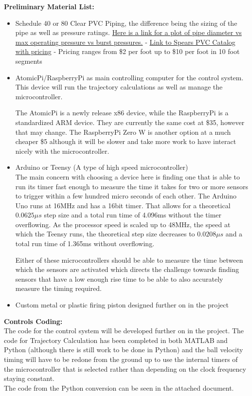 \documentclass[11pt,letterpaper]{scrartcl}
\begin{document}
	\textbf{	Preliminary Material List:}
	\begin{itemize}
	\item Schedule 40 or 80 Clear PVC Piping, the difference being the sizing of the pipe as well as pressure ratings. \href{https://www.engineeringtoolbox.com/pvc-cpvc-pipes-pressures-d_796.html}{Here is a link for a plot of pipe diameter vs max operating pressure vs burst pressures.}
	\subitem - \href{http://63.156.201.111/SMC/PIPE_PIPE.htm#CLR10}{Link to Spears PVC Catalog with pricing}
	\subitem - Pricing ranges from \$2 per foot up to \$10 per foot in 10 foot segments
	
	\item AtomicPi/RaspberryPi as main controlling computer for the control system. This device will run the trajectory calculations as well as manage the microcontroller.
	
	The AtomicPi is a newly release x86 device, while the RaspberryPi is a standardized ARM device. They are currently the same cost at \$35, however that may change. The RaspberryPi Zero W is another option at a much cheaper \$5 although it will be slower and take more work to have interact nicely with the microcontroller.
	
	\item Arduino or Teensy (A type of high speed microcontroller)\\
	The main concern with choosing a device here is finding one that is able to run its timer fast enough to measure the time it takes for two or more sensors to trigger within a few hundred micro seconds of each other. The Arduino Uno runs at 16MHz and has a 16bit timer. That allows for a theoretical $0.0625\mu s$ step size and a total run time of 4.096ms without the timer overflowing. As the processor speed is scaled up to 48MHz, the speed at which the Teensy runs, the theoretical step size decreases to $0.0208\mu s$ and a total run time of 1.365ms without overflowing. 
	
	Either of these microcontrollers should be able to measure the time between which the sensors are activated which directs the challenge towards finding sensors that have a low enough rise time to be able to also accurately measure the timing required.
	
	\item Custom metal or plastic firing piston designed further on in the project
	\end{itemize}

	\textbf{Controls Coding:}\\
	The code for the control system will be developed further on in the project. The code for Trajectory Calculation has been completed in both MATLAB and Python (although there is still work to be done in Python) and the ball velocity timing will have to be redone from the ground up to use the internal timers of the microcontroller that is selected rather than depending on the clock frequency staying constant.\\
	
	The code from the Python conversion can be seen in the attached document.
\end{document}

